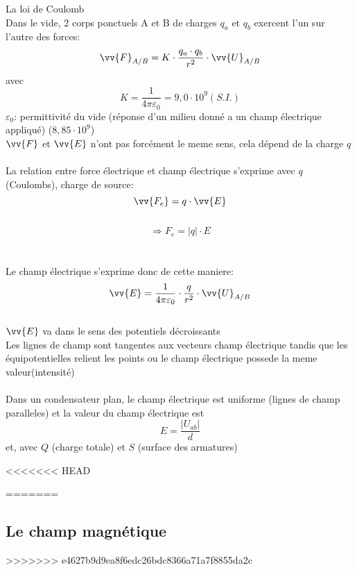 \begin{Definition}
La loi de Coulomb\\
Dans le vide, 2 corps ponctuels A et B de charges $q_{a}$ et $q_{b}$ exercent l'un sur l'autre des forces: \\
$$ \vv{F}_{A/B} = K \cdot \dfrac{q_{a}\cdot q_{b}}{r^2} \cdot \vv{U}_{A/B} $$
avec\\
$$K=\dfrac{1}{4\pi\varepsilon_{0}}= 9,0\cdot 10^9(S.I.)$$
$\varepsilon_{0}$: permittivité du vide (réponse d'un milieu donné a un champ électrique appliqué) ($8,85\cdot 10^9$)\\
\danger[5ex] \qquad $\vv{F}$ et $\vv{E}$ n'ont pas forcément le meme sens, cela dépend de la charge $q$\\\\

La relation entre force électrique et champ électrique s'exprime avec $q$ (Coulombs), charge de source:
$$\vv{F_{e}}=q\cdot \vv{E}$$\\
$$\Rightarrow F_{e}=|q|\cdot E$$\\\\
Le champ électrique s'exprime donc de cette maniere:
$$\vv{E}= \dfrac{1}{4\pi\varepsilon_{0}}\cdot\dfrac{q}{r^2}\cdot\vv{U}_{A/B}$$\\
$\vv{E}$ va dans le sens des potentiels décroissants\\
Les lignes de champ sont tangentes aux vecteurs champ électrique tandis que les équipotentielles relient les points ou le champ électrique possede la meme valeur(intensité) \\\\
Dans un condensateur plan, le champ électrique est uniforme (lignes de champ paralleles) et la valeur du champ électrique est
$$E=\dfrac{|U_{ab}|}{d}$$
et, avec $Q$ (charge totale) et $S$ (surface des armatures)
\\

\end{Definition}


<<<<<<< HEAD














=======
\subsection{Le champ magnétique}
>>>>>>> e4627b9d9ea8f6edc26bdc8366a71a7f8855da2c

